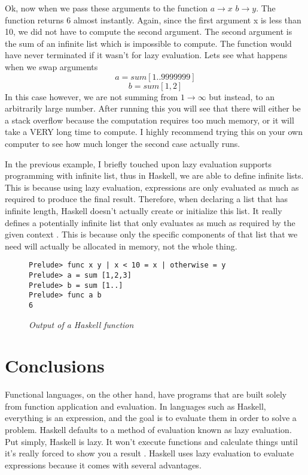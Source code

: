 \documentclass{article}
\begin{document}
\medskip\noindent
Ok, now when we pass these arguments to the function $a \rightarrow x$  $b \rightarrow y$. The function returns 6 almost instantly. Again, since the first argument x is less than 10, we did not have to compute the second argument. The second argument is the sum of an infinite list which is impossible to compute. The function would have never terminated if it wasn't for lazy evaluation. Lets see what happens when we swap arguments $$a = sum [1..9999999]$$ $$b = sum [1,2]$$ In this case however, we are not summing from $1 \rightarrow \infty$ but instead, to an arbitrarily large number. After running this you will see that there will either be a stack overflow because the computation requires too much memory, or it will take a VERY long time to compute. I highly recommend trying this on your own computer to see how much longer the second case actually runs.

\medskip\noindent
In the previous example, I briefly touched upon lazy evaluation supports programming with infinite list, thus in Haskell, we are able to define infinite lists. This is because using lazy evaluation, expressions are only evaluated as much as required to produce the final result. Therefore, when declaring a list that has infinite length, Haskell doesn't actually create or initialize this list. It really defines a potentially infinite list that only evaluates as much as required by the given context \cite{GHutton}. This is because only the specific components of that list that we need will actually be allocated in memory, not the whole thing.
\begin{figure}[H]
    \begin{lstlisting}
Prelude> func x y | x < 10 = x | otherwise = y
Prelude> a = sum [1,2,3]
Prelude> b = sum [1..]
Prelude> func a b
6
    \end{lstlisting}
    \caption{\textit{Output of a Haskell function}}
\end{figure}


\section{Conclusions}\label{conclusions}
Functional languages, on the other hand, have programs that are built solely from function application and evaluation. In languages such as Haskell, everything is an expression, and the goal is to evaluate them in order to solve a problem. Haskell defaults to a method of evaluation known as lazy evaluation. Put simply, Haskell is lazy. It won’t execute functions and calculate things until it’s really forced to show you a result \cite{LYAH}. Haskell uses lazy evaluation to evaluate expressions because it comes with several advantages. 
\end{document}

